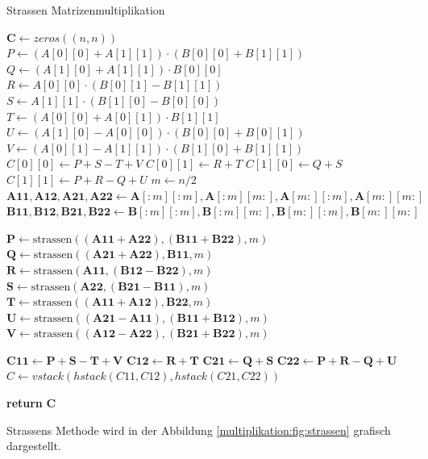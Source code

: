 \begin{algorithm}\footnotesize\caption{Strassen Matrizenmultiplikation}
	\label{multiplikation:alg:strassen}
	\setlength{\lineskip}{7pt}
	\begin{algorithmic}
		\State  $ \mathbf{C} \gets zeros((n, n))$
		\State $P  \gets (A[0][0]+A[1][1])\cdot( B[0][0]+B[1][1])$
		\State   $Q  \gets (A[1][0]+A[1][1])\cdot B[0][0]$
		\State   $R  \gets A[0][0]\cdot (B[0][1]-B[1][1])$
		\State   $S  \gets A[1][1]\cdot (B[1][0]-B[0][0])$
		\State   $T  \gets (A[0][0]+A[0][1])\cdot B[1][1]$
		\State   $U  \gets (A[1][0]-A[0][0])\cdot (B[0][0]+B[0][1])$
		\State   $V  \gets (A[0][1]-A[1][1])\cdot (B[1][0]+B[1][1])$
		\State   $C[0][0]  \gets P+S-T+V$
		\State   $C[0][1]  \gets R+T$
		\State   $C[1][0]  \gets Q+S$
		\State   $C[1][1]  \gets P+R-Q+U$
		\Else
		\State  $ m \gets n/2$
		\State $\mathbf{A11}, \mathbf{A12}, \mathbf{A21}, \mathbf{A22} \gets \mathbf{A}[:m][:m], \mathbf{A}[:m][m:], \mathbf{A}[m:][:m], \mathbf{A}[m:][m:]$
		\State $\mathbf{B11}, \mathbf{B12}, \mathbf{B21}, \mathbf{B22} \gets \mathbf{B}[:m][:m], \mathbf{B}[:m][m:], \mathbf{B}[m:][:m], \mathbf{B}[m:][m:]$

		\State $ \mathbf{P} \gets \text{strassen}((\mathbf{A11}+ \mathbf{A22}),(\mathbf{B11}+\mathbf{B22}), m)$
		\State $ \mathbf{Q} \gets \text{strassen}((\mathbf{A21}+ \mathbf{A22}), \mathbf{B11},m)$
		\State $ \mathbf{R} \gets \text{strassen}( \mathbf{A11},(\mathbf{B12}-  \mathbf{B22}),m)$
		\State $ \mathbf{S} \gets \text{strassen}( \mathbf{A22},(\mathbf{B21}-  \mathbf{B11}),m)$
		\State $ \mathbf{T} \gets \text{strassen}((\mathbf{A11}+ \mathbf{A12}), \mathbf{B22},m)$
		\State $ \mathbf{U} \gets \text{strassen}((\mathbf{A21}- \mathbf{A11}),(\mathbf{B11}+\mathbf{B12}),m)$
		\State $ \mathbf{V} \gets \text{strassen}((\mathbf{A12}- \mathbf{A22}),(\mathbf{B21}+\mathbf{B22}),m)$



		\State   $\mathbf{C11}  \gets \mathbf{P+S-T+V}$
		\State   $\mathbf{C12}  \gets \mathbf{R+T}$
		\State   $\mathbf{C21}  \gets \mathbf{Q+S}$
		\State   $\mathbf{C22}  \gets \mathbf{P+R-Q+U}$
		\State $  C \gets vstack(hstack(C11, C12), hstack(C21, C22))$

		\EndIf
		\State \textbf{return} $\textbf{C}$

		\EndFunction
	\end{algorithmic}
\end{algorithm}
Strassens Methode wird in der Abbildung \ref{multiplikation:fig:strassen} grafisch dargestellt.
